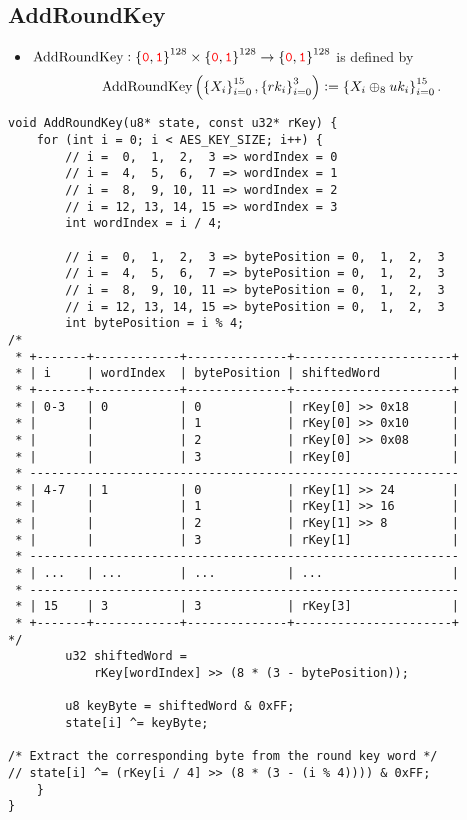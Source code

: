 \subsection{AddRoundKey}
\begin{itemize}
	\item $\text{AddRoundKey}:\set{\textcolor{red}{\texttt{0}},\textcolor{red}{\texttt{1}}}^{128}\times\set{\textcolor{red}{\texttt{0}},\textcolor{red}{\texttt{1}}}^{128}\to\set{\textcolor{red}{\texttt{0}},\textcolor{red}{\texttt{1}}}^{128}$ is defined by \[
	\text{AddRoundKey}\left(\set{X_i}_{i=0}^{15},\set{rk_i}_{i=0}^{3}\right):=\set{X_i\oplus_{8} uk_i}_{i=0}^{15}.
	\] 
\end{itemize}
\begin{lstlisting}[style=C, caption={AES AddRoundKey},captionpos=t]
void AddRoundKey(u8* state, const u32* rKey) {
	for (int i = 0; i < AES_KEY_SIZE; i++) {
		// i =  0,  1,  2,  3 => wordIndex = 0
		// i =  4,  5,  6,  7 => wordIndex = 1
		// i =  8,  9, 10, 11 => wordIndex = 2
		// i = 12, 13, 14, 15 => wordIndex = 3 
		int wordIndex = i / 4;
		
		// i =  0,  1,  2,  3 => bytePosition = 0,  1,  2,  3
		// i =  4,  5,  6,  7 => bytePosition = 0,  1,  2,  3
		// i =  8,  9, 10, 11 => bytePosition = 0,  1,  2,  3
		// i = 12, 13, 14, 15 => bytePosition = 0,  1,  2,  3 
		int bytePosition = i % 4;
/* 
 * +-------+------------+--------------+----------------------+
 * | i     | wordIndex  | bytePosition | shiftedWord          |
 * +-------+------------+--------------+----------------------+
 * | 0-3   | 0          | 0            | rKey[0] >> 0x18      |
 * |       |            | 1            | rKey[0] >> 0x10      |
 * |       |            | 2            | rKey[0] >> 0x08      |
 * |       |            | 3            | rKey[0]              |
 * ------------------------------------------------------------
 * | 4-7   | 1          | 0            | rKey[1] >> 24        |
 * |       |            | 1            | rKey[1] >> 16        |
 * |       |            | 2            | rKey[1] >> 8         |
 * |       |            | 3            | rKey[1]              |
 * ------------------------------------------------------------
 * | ...   | ...        | ...          | ...                  |
 * ------------------------------------------------------------
 * | 15    | 3          | 3            | rKey[3]              |
 * +-------+------------+--------------+----------------------+
*/
		u32 shiftedWord =
			rKey[wordIndex] >> (8 * (3 - bytePosition));
		
		u8 keyByte = shiftedWord & 0xFF;
		state[i] ^= keyByte;
		
/* Extract the corresponding byte from the round key word */
// state[i] ^= (rKey[i / 4] >> (8 * (3 - (i % 4)))) & 0xFF;
	}
}
\end{lstlisting}

